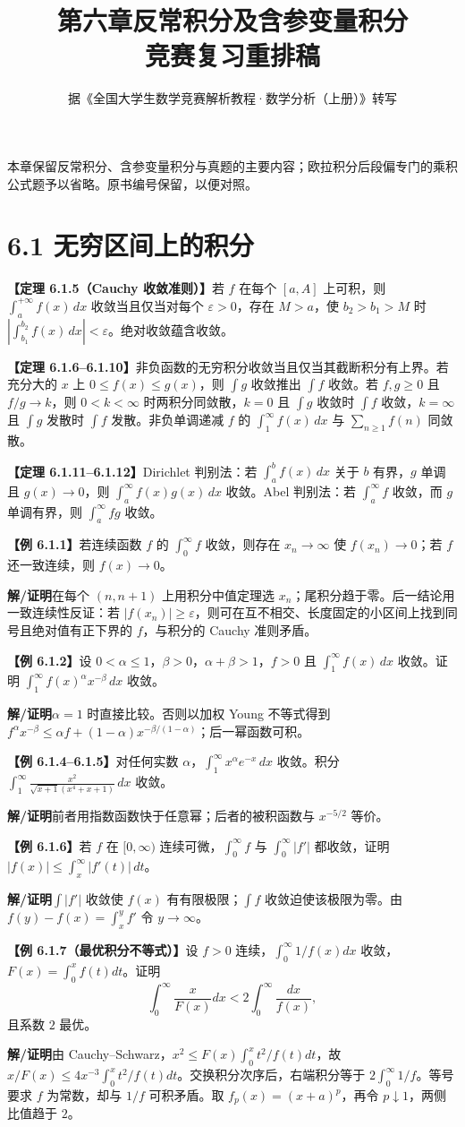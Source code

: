\documentclass[UTF8,a4paper,11pt]{ctexart}
\title{第六章\quad 反常积分及含参变量积分\\\large 竞赛复习重排稿}
\author{据《全国大学生数学竞赛解析教程·数学分析（上册）》转写}
\date{}
\newcommand{\ex}[1]{\par\noindent\textbf{【例 #1】}\;}
\newcommand{\thm}[1]{\par\noindent\textbf{【定理 #1】}\;}
\newcommand{\sol}{\par\noindent\textbf{解/证明}\;}
\begin{document}
\maketitle
\noindent 本章保留反常积分、含参变量积分与真题的主要内容；欧拉积分后段偏专门的乘积公式题予以省略。原书编号保留，以便对照。
\section*{6.1 无穷区间上的积分}
\thm{6.1.5（Cauchy 收敛准则）}若 $f$ 在每个 $[a,A]$ 上可积，则 $\int_a^{+\infty}f(x)\,dx$ 收敛当且仅当对每个 $\varepsilon>0$，存在 $M>a$，使 $b_2>b_1>M$ 时 $\left|\int_{b_1}^{b_2}f(x)\,dx\right|<\varepsilon$。绝对收敛蕴含收敛。
\thm{6.1.6--6.1.10}非负函数的无穷积分收敛当且仅当其截断积分有上界。若充分大的 $x$ 上 $0\le f(x)\le g(x)$，则 $\int g$ 收敛推出 $\int f$ 收敛。若 $f,g\ge0$ 且 $f/g\to k$，则 $0<k<\infty$ 时两积分同敛散，$k=0$ 且 $\int g$ 收敛时 $\int f$ 收敛，$k=\infty$ 且 $\int g$ 发散时 $\int f$ 发散。非负单调递减 $f$ 的 $\int_1^\infty f(x)\,dx$ 与 $\sum_{n\ge1}f(n)$ 同敛散。
\thm{6.1.11--6.1.12}Dirichlet 判别法：若 $\int_a^b f(x)\,dx$ 关于 $b$ 有界，$g$ 单调且 $g(x)\to0$，则 $\int_a^\infty f(x)g(x)\,dx$ 收敛。Abel 判别法：若 $\int_a^\infty f$ 收敛，而 $g$ 单调有界，则 $\int_a^\infty fg$ 收敛。
\ex{6.1.1}若连续函数 $f$ 的 $\int_0^\infty f$ 收敛，则存在 $x_n\to\infty$ 使 $f(x_n)\to0$；若 $f$ 还一致连续，则 $f(x)\to0$。
\sol 在每个 $(n,n+1)$ 上用积分中值定理选 $x_n$；尾积分趋于零。后一结论用一致连续性反证：若 $|f(x_n)|\ge\varepsilon$，则可在互不相交、长度固定的小区间上找到同号且绝对值有正下界的 $f$，与积分的 Cauchy 准则矛盾。
\ex{6.1.2}设 $0<\alpha\le1$，$\beta>0$，$\alpha+\beta>1$，$f>0$ 且 $\int_1^\infty f(x)\,dx$ 收敛。证明 $\int_1^\infty f(x)^\alpha x^{-\beta}\,dx$ 收敛。
\sol $\alpha=1$ 时直接比较。否则以加权 Young 不等式得到 $f^\alpha x^{-\beta}\le \alpha f+(1-\alpha)x^{-\beta/(1-\alpha)}$；后一幂函数可积。
\ex{6.1.4--6.1.5}对任何实数 $\alpha$，$\int_1^\infty x^\alpha e^{-x}\,dx$ 收敛。积分 $\int_1^\infty \frac{x^2}{\sqrt{x+1}(x^4+x+1)}\,dx$ 收敛。
\sol 前者用指数函数快于任意幂；后者的被积函数与 $x^{-5/2}$ 等价。
\ex{6.1.6}若 $f$ 在 $[0,\infty)$ 连续可微，$\int_0^\infty f$ 与 $\int_0^\infty |f'|$ 都收敛，证明 $|f(x)|\le\int_x^\infty |f'(t)|\,dt$。
\sol $\int|f'|$ 收敛使 $f(x)$ 有有限极限；$\int f$ 收敛迫使该极限为零。由 $f(y)-f(x)=\int_x^y f'$ 令 $y\to\infty$。
\ex{6.1.7（最优积分不等式）}设 $f>0$ 连续，$\int_0^\infty 1/f(x)dx$ 收敛，$F(x)=\int_0^xf(t)dt$。证明
\[\int_0^\infty\frac{x}{F(x)}dx<2\int_0^\infty\frac{dx}{f(x)},\]
且系数 $2$ 最优。
\sol 由 Cauchy--Schwarz，$x^2\le F(x)\int_0^x t^2/f(t)dt$，故 $x/F(x)\le4x^{-3}\int_0^xt^2/f(t)dt$。交换积分次序后，右端积分等于 $2\int_0^\infty1/f$。等号要求 $f$ 为常数，却与 $1/f$ 可积矛盾。取 $f_p(x)=(x+a)^p$，再令 $p\downarrow1$，两侧比值趋于 $2$。
\end{document}
